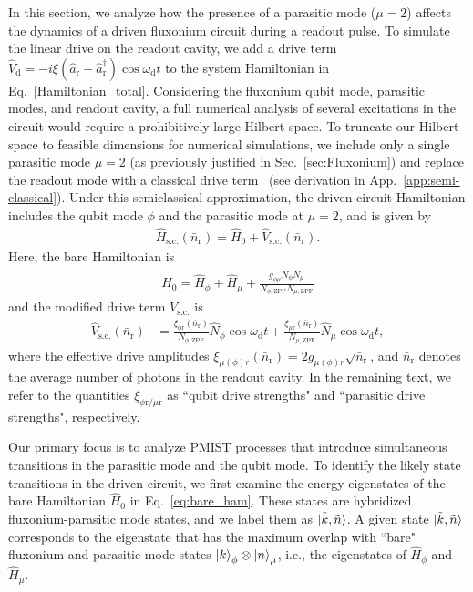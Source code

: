 \documentclass[%
reprint,
superscriptaddress,
 amsmath,amssymb,
 aps,
 prx,
longbibliography,
floatfix,
]{revtex4-2}
\begin{document}
In this section, we analyze how the presence of a parasitic mode ($\mu=2$) affects the dynamics of a driven fluxonium circuit during a readout pulse. To simulate the linear drive on the readout cavity, we add a drive term $\hat{V}_\textrm{d}=-i\xi (\hat a_\textrm{r}-\hat a_\textrm{r}^\dagger)\cos{\omega_\textrm{d} t}$ to the system Hamiltonian in Eq.~\ref{Hamiltonian_total}. Considering the fluxonium qubit mode, parasitic modes, and readout cavity, a full numerical analysis of several excitations in the circuit would require a prohibitively large Hilbert space. To truncate our Hilbert space to feasible dimensions for numerical simulations, we include only a single parasitic mode $\mu=2$ (as previously justified in Sec.~\ref{sec:Fluxonium}) and replace the readout mode with a classical drive term~\cite{cohen2023reminiscence,dumas2024unified} (see derivation in App.~\ref{app:semi-classical}). Under this semiclassical approximation, the driven circuit Hamiltonian includes the qubit mode $\phi$ and the parasitic mode at $\mu=2$, and is given by
\begin{align}
  \hat H_\textrm{s.c.}(\bar n_\textrm{r})=\hat H_0+\hat V_\textrm{s.c.}(\bar n_\textrm{r}).  \label{eq:drive_Ham}
\end{align}
Here, the bare Hamiltonian is
\begin{align}
\hat H_0=\hat H_\phi+\hat H_{\mu}+\frac{g_{\phi\mu}\hat N_\phi \hat N_\mu }{N_{\phi,\mathrm{ZPF}}N_{\mu,\mathrm{ZPF}}} \label{eq:bare_ham} 
\end{align}
and the modified drive term $V_\textrm{s.c.}$ is
\begin{align}
    \hat V_\textrm{s.c.}(\bar n_\textrm{r})&=\frac{\xi_{\phi \textrm{r}}(\bar n_\textrm{r})}{N_{\phi,\mathrm{ZPF}}} \hat N_\phi\cos{\omega_\textrm{d} t}+\frac{\xi_{\mu \textrm{r}}(\bar n_\textrm{r})}{N_{\mu, \mathrm{ZPF}}} \hat N_\mu\cos{\omega_\textrm{d} t}\label{eq:drive},
\end{align}
where the effective drive amplitudes $\xi_{\mu(\phi) r}(\bar n_\textrm{r})=2g_{\mu(\phi) r}\sqrt{\bar n_\textrm{r}}$, and $\bar n_\textrm{r}$ denotes the average number of photons in the readout cavity. In the remaining text, we refer to the quantities $\xi_{\phi \textrm{r}/\mu \textrm{r}}$ as ``qubit drive strengths" and ``parasitic drive strengths", respectively.

Our primary focus is to analyze PMIST processes that introduce simultaneous transitions in the parasitic mode and the qubit mode. To identify the likely state transitions in the driven circuit, we first examine the energy eigenstates of the bare Hamiltonian $\hat{H}_0$ in Eq.~\ref{eq:bare_ham}. These states are hybridized fluxonium-parasitic mode states, and we label them as $\ket{\tilde{k}, \tilde{n}}$. A given state $\ket{\tilde{k}, \tilde{n}}$ corresponds to the eigenstate that has the maximum overlap with ``bare" fluxonium and parasitic mode states $\ket{k}_\phi\otimes\ket{n}_\mu$, i.e., the eigenstates of $\hat H_{\phi}$ and $\hat H_{\mu}$.
\end{document}
